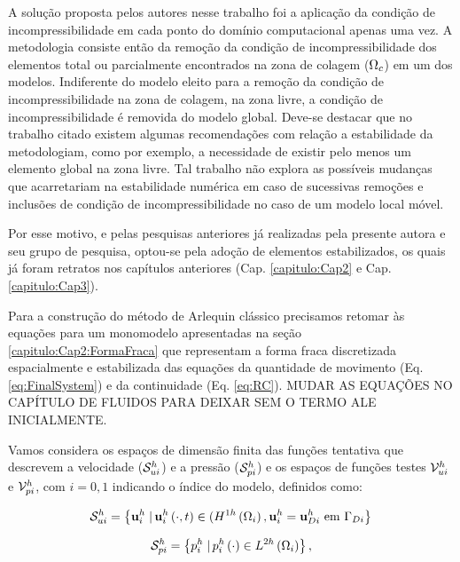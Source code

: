 \documentclass[tese_patricia]{subfiles}
\begin{document}
A solução proposta pelos autores nesse trabalho \cite{JamondD:2013} foi a aplicação da condição de incompressibilidade em cada ponto do domínio computacional apenas uma vez. A metodologia consiste então da remoção da condição de incompressibilidade dos elementos total ou parcialmente encontrados na zona de colagem ($\Omega_c$) em um dos modelos. Indiferente do modelo eleito para a remoção da condição de incompressibilidade na zona de colagem, na zona livre, a condição de incompressibilidade é removida do modelo global. Deve-se destacar que no trabalho citado existem algumas recomendações com relação a estabilidade da metodologiam, como por exemplo, a necessidade de existir pelo menos um elemento global na zona livre. Tal trabalho não explora as possíveis mudanças que acarretariam na estabilidade numérica em caso de sucessivas remoções e inclusões de condição de incompressibilidade no caso de um modelo local móvel.

Por esse motivo, e pelas pesquisas anteriores já realizadas pela presente autora e seu grupo de pesquisa, optou-se pela adoção de elementos estabilizados, os quais já foram retratos nos capítulos anteriores (Cap. \ref{capitulo:Cap2} e Cap. \ref{capitulo:Cap3}).

Para a construção do método de Arlequin clássico precisamos retomar às equações para um monomodelo apresentadas na seção \ref{capitulo:Cap2:FormaFraca} que representam a forma fraca discretizada espacialmente e estabilizada das equações da quantidade de movimento (Eq. \ref{eq:FinalSystem}) e da continuidade (Eq. \ref{eq:RC}). MUDAR AS EQUAÇÕES NO CAPÍTULO DE FLUIDOS PARA DEIXAR SEM O TERMO ALE INICIALMENTE.

Vamos considera os espaços de dimensão finita das funções tentativa que descrevem a velocidade ($\mathcal{S}_{ui}^h$) e a pressão ($\mathcal{S}_{pi}^h$) e os espaços de funções testes $\mathcal{V}_{ui}^h$ e $\mathcal{V}_{pi}^h$, com $i = 0,1$ indicando o índice do modelo, definidos como:

\begin{align}
	\mathcal{S}_{ui}^h = \left\{\mathbf{u}_{i}^{h} \left . \right| \mathbf{u}_{i}^{h} \left(\cdot,t\right) \in (H^{1h}\left(\Omega_{i}\right), \mathbf{u}_{i}^{h} = \mathbf{u}_{Di}^{h} \textrm { em}  \ \Gamma_{Di} \right\}
\end{align}

\begin{align}
	\mathcal{S}_{pi}^h = \left\{p_{i}^{h} \left . \right| p_{i}^{h} \left(\cdot\right) \in L^{2h}\left(\Omega_{i}\right) \right\},
\end{align}
\end{document}
